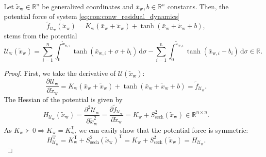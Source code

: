 \begin{lemma}\label{lemma:con:conw_symmetric_potential}
    Let $\tilde{x}_\mathrm{w} \in \mathbb{R}^n$ be generalized coordinates and $\bar{x}_\mathrm{w}, b \in \mathbb{R}^n$ constants.
    Then, the potential force of system \eqref{eq:con:conw_residual_dynamics}
    \begin{equation}
        \tilde{f}_{\mathcal{U}_\mathrm{w}}(\tilde{x}_\mathrm{w}) = K_\mathrm{w} (\bar{x}_\mathrm{w} + \tilde{x}_\mathrm{w}) + \tanh(\bar{x}_\mathrm{w} + \tilde{x}_\mathrm{w} + b),
    \end{equation}
    stems from the potential
    \begin{equation}
        \mathcal{U}_\mathrm{w}(\tilde{x}_\mathrm{w}) = \sum_{i=1}^n \int_{0}^{\tilde{x}_{\mathrm{w},i}} \tanh(\bar{x}_{\mathrm{w},i}+\sigma+b_i) \, \mathrm{d} \sigma - \sum_{i=1}^n \int_{0}^{\tilde{x}_{\mathrm{w},i}} \tanh(\bar{x}_{\mathrm{w},i}+b_i) \, \mathrm{d} \sigma \in \mathbb{R}.
    \end{equation}
\end{lemma}
\begin{proof}
    First, we take the derivative of $\mathcal{U}(\tilde{x}_\mathrm{w})$:
    \begin{equation}
        \frac{\partial \mathcal{U}_\mathrm{w}}{\partial \tilde{x}_\mathrm{w}} = K_\mathrm{w} (\bar{x}_\mathrm{w} + \tilde{x}_\mathrm{w}) + \tanh(\bar{x}_\mathrm{w} + \tilde{x}_\mathrm{w} + b) = \tilde{f}_{\mathcal{U}_\mathrm{w}}.
    \end{equation}
    The Hessian of the potential is given by
    \begin{equation}
        H_{\mathcal{U}_\mathrm{w}}(\tilde{x}_\mathrm{w}) = \frac{\partial^2 \mathcal{U}_\mathrm{w}}{\partial \tilde{x}_\mathrm{w}^2} = \frac{\partial \tilde{f}_{\mathcal{U}_\mathrm{w}}}{\partial \tilde{x}_\mathrm{w}}  = K_\mathrm{w} + S_\mathrm{sech}^{2}(\tilde{x}_\mathrm{w}) \in \mathbb{R}^{n \times n}.
    \end{equation}
    As $K_\mathrm{w} \succ 0 \Rightarrow K_\mathrm{w} = K_\mathrm{w}^\mathrm{T}$, we can easily show that the potential force is symmetric:
    \begin{equation}
        H_{\mathcal{U}_\mathrm{w}}^\mathrm{T} = K_\mathrm{w}^\mathrm{T}  + S_\mathrm{sech}^{2}(\tilde{x}_\mathrm{w})^\mathrm{T} = K_\mathrm{w} + S_\mathrm{sech}^{2}(\tilde{x}_\mathrm{w}) = H_{\mathcal{U}_\mathrm{w}}.
    \end{equation}
\end{proof}

